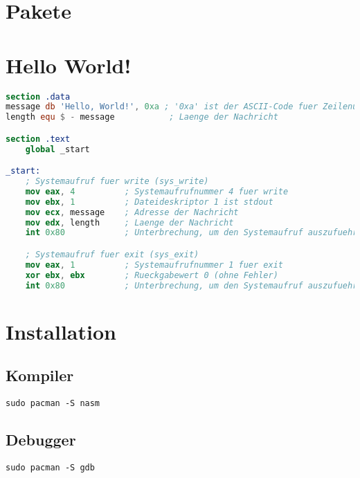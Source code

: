 \documentclass[a4paper,12pt,twoside]{article}
\begin{document}
\section{Pakete}
\section{Hello World!}
\begin{center}
  \begin{minipage}{1.0\textwidth}
    \begin{lstlisting}[language=NASM]
section .data
message db 'Hello, World!', 0xa ; '0xa' ist der ASCII-Code fuer Zeilenumbruch
length equ $ - message           ; Laenge der Nachricht

section .text
    global _start

_start:
    ; Systemaufruf fuer write (sys_write)
    mov eax, 4          ; Systemaufrufnummer 4 fuer write
    mov ebx, 1          ; Dateideskriptor 1 ist stdout
    mov ecx, message    ; Adresse der Nachricht
    mov edx, length     ; Laenge der Nachricht
    int 0x80            ; Unterbrechung, um den Systemaufruf auszufuehren

    ; Systemaufruf fuer exit (sys_exit)
    mov eax, 1          ; Systemaufrufnummer 1 fuer exit
    xor ebx, ebx        ; Rueckgabewert 0 (ohne Fehler)
    int 0x80            ; Unterbrechung, um den Systemaufruf auszufuehren	  
    \end{lstlisting}
  \end{minipage}
\end{center}
\section{Installation}
\subsection{Kompiler}
\verb|sudo pacman -S nasm|
\subsection{Debugger}
\verb|sudo pacman -S gdb|
\end{document}
